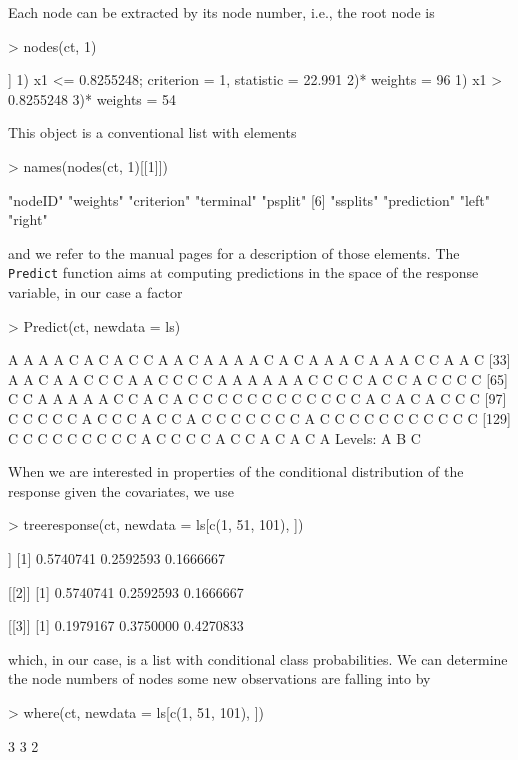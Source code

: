 \documentclass{Z}
\begin{document}
Each node can be extracted by its node number, i.e., the root node is
\begin{Schunk}
\begin{Sinput}
> nodes(ct, 1)
\end{Sinput}
\begin{Soutput}
[[1]]
1) x1 <= 0.8255248; criterion = 1, statistic = 22.991
  2)*  weights = 96 
1) x1 > 0.8255248
  3)*  weights = 54 
\end{Soutput}
\end{Schunk}
This object is a conventional list with elements
\begin{Schunk}
\begin{Sinput}
> names(nodes(ct, 1)[[1]])
\end{Sinput}
\begin{Soutput}
[1] "nodeID"     "weights"    "criterion"  "terminal"   "psplit"    
[6] "ssplits"    "prediction" "left"       "right"     
\end{Soutput}
\end{Schunk}
and we refer to the manual pages for a description of those elements.
The \texttt{Predict} function aims at computing predictions in the space of
the response variable, in our case a factor
\begin{Schunk}
\begin{Sinput}
> Predict(ct, newdata = ls)
\end{Sinput}
\begin{Soutput}
  [1] A A A A C A C A C C A A C A A A A C A C A A A C A A A C C A A C
 [33] A A C A A C C C A A C C C C A A A A A A C C C C A C C A C C C C
 [65] C C A A A A A C C A C A C C C C C C C C C C C C A C A C A C C C
 [97] C C C C C A C C C A C C A C C C C C C C A C C C C C C C C C C C
[129] C C C C C C C C C A C C C C A C C A C A C A
Levels: A B C
\end{Soutput}
\end{Schunk}
When we are interested in properties of the conditional distribution of the
response given the covariates, we use
\begin{Schunk}
\begin{Sinput}
> treeresponse(ct, newdata = ls[c(1, 51, 101), ])
\end{Sinput}
\begin{Soutput}
[[1]]
[1] 0.5740741 0.2592593 0.1666667

[[2]]
[1] 0.5740741 0.2592593 0.1666667

[[3]]
[1] 0.1979167 0.3750000 0.4270833
\end{Soutput}
\end{Schunk}
which, in our case, is a list with conditional class probabilities.
We can determine the node numbers of nodes some new observations are falling
into by
\begin{Schunk}
\begin{Sinput}
> where(ct, newdata = ls[c(1, 51, 101), ])
\end{Sinput}
\begin{Soutput}
[1] 3 3 2
\end{Soutput}
\end{Schunk}
\end{document}
